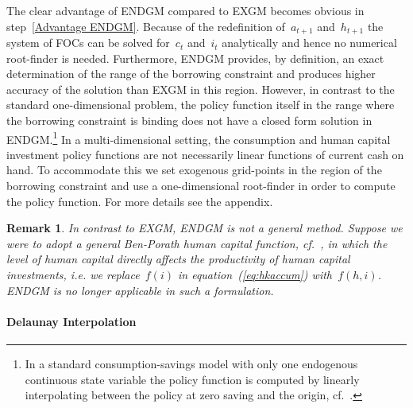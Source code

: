 \documentclass[a4paper,12pt]{article}
\newtheorem{remark}[theorem]{Remark}
\begin{document}
The clear advantage of ENDGM compared to EXGM becomes obvious in step~\ref{Advantage ENDGM}. Because of the redefinition of~$a_{t+1}$ and~$h_{t+1}$ the system of FOCs can be solved for~$c_{t}$ and~$i_{t}$ analytically and hence no numerical root-finder is needed. Furthermore, ENDGM provides, by definition, an exact determination of the range of the borrowing constraint and produces higher accuracy of the solution than EXGM in this region. However, in contrast to the standard one-dimensional problem, the policy function itself in the range where the borrowing constraint is binding does not have a closed form solution in ENDGM.\footnote{In a standard consumption-savings model with only one endogenous continuous state variable the policy function is computed by linearly interpolating between the policy at zero saving and the origin, cf.~.}
In a multi-dimensional setting, the consumption and human capital investment policy functions are not necessarily linear functions of current cash on hand. To accommodate this we set exogenous grid-points in the region of the borrowing constraint and use a one-dimensional root-finder in order to compute the policy function. For more details see the appendix.

\begin{remark}
\label{rem:failureendgm}
In contrast to EXGM, ENDGM is not a general method. Suppose we were to adopt a general Ben-Porath human capital function, cf.~, in which the level of human capital directly affects the productivity of human capital investments, i.e. we replace~$f(i)$ in equation~(\ref{eq:hkaccum}) with~$f(h,i)$. ENDGM is no longer applicable in such a formulation.
\end{remark}

\paragraph{Delaunay Interpolation}
\end{document}

